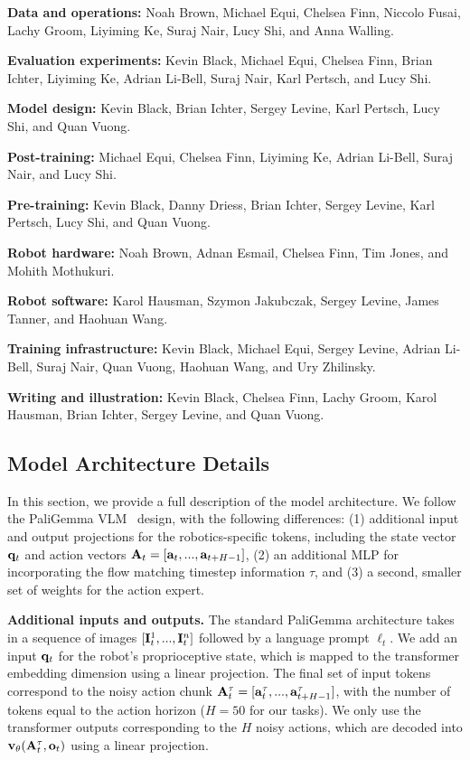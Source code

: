 \noindent \textbf{Data and operations:} Noah Brown, Michael Equi, Chelsea Finn, Niccolo Fusai, Lachy Groom, Liyiming Ke, Suraj Nair, Lucy Shi, and Anna Walling.

\noindent \textbf{Evaluation experiments:} Kevin Black, Michael Equi, Chelsea Finn, Brian Ichter, Liyiming Ke, Adrian Li-Bell, Suraj Nair, Karl Pertsch, and Lucy Shi.

\noindent \textbf{Model design:} Kevin Black, Brian Ichter, Sergey Levine, Karl Pertsch, Lucy Shi, and Quan Vuong.

\noindent \textbf{Post-training:} Michael Equi, Chelsea Finn, Liyiming Ke, Adrian Li-Bell, Suraj Nair, and Lucy Shi.

\noindent \textbf{Pre-training:} Kevin Black, Danny Driess, Brian Ichter, Sergey Levine, Karl Pertsch, Lucy Shi, and Quan Vuong.

\noindent \textbf{Robot hardware:} Noah Brown, Adnan Esmail, Chelsea Finn, Tim Jones, and Mohith Mothukuri.

\noindent \textbf{Robot software:} Karol Hausman, Szymon Jakubczak, Sergey Levine, James Tanner, and Haohuan Wang.

\noindent \textbf{Training infrastructure:} Kevin Black, Michael Equi, Sergey Levine, Adrian Li-Bell, Suraj Nair, Quan Vuong, Haohuan Wang, and Ury Zhilinsky.

\noindent \textbf{Writing and illustration:} Kevin Black, Chelsea Finn, Lachy Groom, Karol Hausman, Brian Ichter, Sergey Levine, and Quan Vuong.

\subsection{Model Architecture Details}
\label{app:architecture}

In this section, we provide a full description of the model architecture. We follow the PaliGemma VLM~\citep{beyer2024paligemma} design, with the following differences: (1) additional input and output projections for the robotics-specific tokens, including the state vector $\mathbf{q}_t$ and action vectors $\mathbf{A}_t = [\mathbf{a}_t, ..., \mathbf{a}_{t+H-1}]$, (2) an additional MLP for incorporating the flow matching timestep information $\tau$, and (3) a second, smaller set of weights for the action expert.

\textbf{Additional inputs and outputs.} The standard PaliGemma architecture takes in a sequence of images $[\mathbf{I}^1_t, ..., \mathbf{I}^n_t]$ followed by a language prompt $\ell_t$. We add an input $\mathbf{q}_t$ for the robot's proprioceptive state, which is mapped to the transformer embedding dimension using a linear projection. The final set of input tokens correspond to the noisy action chunk \mbox{$\mathbf{A}^\tau_t = [\mathbf{a}^\tau_t, ..., \mathbf{a}^\tau_{t+H-1}]$}, with the number of tokens equal to the action horizon ($H = 50$ for our tasks). We only use the transformer outputs corresponding to the $H$ noisy actions, which are decoded into $\mathbf{v}_\theta(\mathbf{A}_t^\tau, \mathbf{o}_t)$ using a linear projection.


